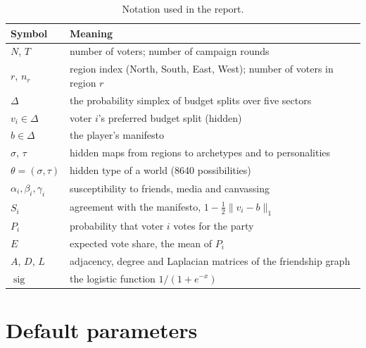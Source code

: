 \documentclass[11pt,a4paper,oneside]{report}
\newcommand{\simplex}{\Delta}
\newcommand{\sig}{\operatorname{sig}}
\begin{document}
\begin{table}[h]
\centering
\caption{Notation used in the report.}
\label{tab:notation}
\small
\begin{tabularx}{\linewidth}{@{}lX@{}}
\toprule
Symbol & Meaning \\
\midrule
$N$, $T$            & number of voters; number of campaign rounds \\
$r$, $n_r$          & region index (North, South, East, West); number of voters in region $r$ \\
$\simplex$          & the probability simplex of budget splits over five sectors \\
$v_i \in \simplex$  & voter $i$'s preferred budget split (hidden) \\
$b \in \simplex$    & the player's manifesto \\
$\sigma$, $\tau$    & hidden maps from regions to archetypes and to personalities \\
$\theta = (\sigma,\tau)$ & hidden type of a world (8640 possibilities) \\
$\alpha_i,\beta_i,\gamma_i$ & susceptibility to friends, media and canvassing \\
$S_i$               & agreement with the manifesto, $1 - \tfrac12\lVert v_i - b\rVert_1$ \\
$P_i$               & probability that voter $i$ votes for the party \\
$E$                 & expected vote share, the mean of $P_i$ \\
$A$, $D$, $L$       & adjacency, degree and Laplacian matrices of the friendship graph \\
$\sig$              & the logistic function $1/(1+e^{-x})$ \\
\bottomrule
\end{tabularx}
\end{table}

\section*{Default parameters}
\end{document}

